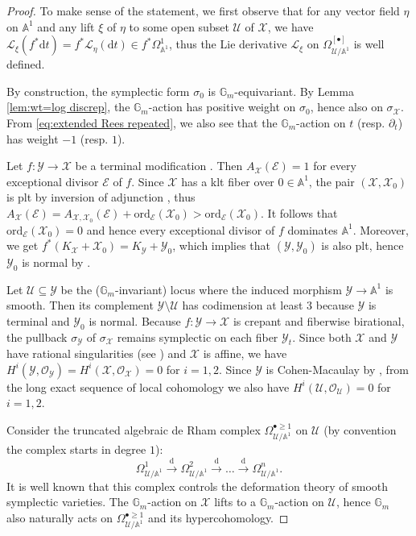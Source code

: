 \documentclass[12pt]{amsart}
\theoremstyle{definition}
\newcommand{\bA}{\mathbb{A}}
\newcommand{\bG}{\mathbb{G}}
\newcommand{\cO}{\mathcal{O}}
\newcommand{\cL}{\mathcal{L}}
\newcommand{\scX}{\mathscr{X}}
\newcommand{\scY}{\mathscr{Y}}
\newcommand{\scE}{\mathscr{E}}
\newcommand{\rd}{\mathrm{d}}
\newcommand{\ord}{\mathrm{ord}}
\numberwithin{equation}{section}
\begin{document}
\begin{proof}
To make sense of the statement, we first observe that for any vector field $\eta$ on $\bA^1$ and any lift $\xi$ of $\eta$ to some open subset $\mathscr{U}$ of $\scX$, we have $\cL_{\xi}(f^*\rd t) = f^*\cL_\eta (\rd t)\in f^*\Omega_{\bA^1}^1$, thus the Lie derivative $\cL_\xi$ on $\Omega_{\mathscr{U}/\bA^1}^{[\bullet]}$ is well defined.

By construction, the symplectic form $\sigma_0$ is $\bG_m$-equivariant. By Lemma \ref{lem:wt=log discrep}, the $\bG_m$-action has positive weight on $\sigma_0$, hence also on $\sigma_{\scX}$. From \eqref{eq:extended Rees repeated}, we also see that the $\bG_m$-action on $t$ (resp. $\partial_t$) has weight $-1$ (resp. $1$). 

Let $f\colon \scY\to \scX$ be a terminal modification \cite[Theorem 1.33]{Kol13}. Then $A_{\scX}(\scE)=1$ for every exceptional divisor $\scE$ of $f$. Since $\scX$ has a klt fiber over $0\in \bA^1$, the pair $(\scX,\scX_0)$ is plt by inversion of adjunction \cite[Theorem 5.50]{KM98}, thus $A_{\scX}(\scE) = A_{\scX,\scX_0}(\scE)+\ord_{\scE}(\scX_0)>\ord_{\scE}(\scX_0)$. It follows that $\ord_{\scE}(\scX_0) = 0$ and hence every exceptional divisor of $f$ dominates $\mathbb{A}^1$. Moreover, we get $f^*(K_{\scX}+\scX_0)=K_{\scY}+\scY_0$, which implies that $(\scY,\scY_0)$ is also plt, hence $\scY_0$ is normal by \cite[Proposition 5.51]{KM98}.

Let $\mathscr{U}\subseteq \scY$ be the ($\bG_m$-invariant) locus where the induced morphism $\scY\to \bA^1$ is smooth. Then its complement $\scY\setminus \mathscr{U}$ has codimension at least $3$ because $\scY$ is terminal and $\scY_0$ is normal. Because $f\colon \scY\to \scX$ is crepant and fiberwise birational, the pullback $\sigma_{\scY}$ of $\sigma_{\scX}$ remains symplectic on each fiber $\scY_t$. Since both $\scX$ and $\scY$ have rational singularities (see \cite[Theorem 5.22]{KM98}) and $\scX$ is affine, we have $H^i(\scY,\cO_{\scY})=H^i(\scX,\cO_{\scX})=0$ for $i=1,2$. Since $\scY$ is Cohen-Macaulay by \cite[Theorem 5.10]{KM98}, from the long exact sequence of local cohomology we also have $H^i(\mathscr{U},\cO_{\mathscr{U}})=0$ for $i=1,2$.

Consider the truncated algebraic de Rham complex $\Omega_{\mathscr{U}/\bA^1}^{\bullet\ge 1}$ on $\mathscr{U}$ (by convention the complex starts in degree $1$):
\[
\Omega_{\mathscr{U}/\bA^1}^1 \xrightarrow{\rd} \Omega_{\mathscr{U}/\bA^1}^2 \xrightarrow{\rd} \dots \xrightarrow{\rd} \Omega_{\mathscr{U}/\bA^1}^n . 
\]
It is well known that this complex controls the deformation theory of smooth symplectic varieties. The $\bG_m$-action on $\scX$ lifts to a $\bG_m$-action on $\mathscr{U}$, hence $\bG_m$ also naturally acts on $\Omega_{\mathscr{U}/\bA^1}^{\bullet\ge 1}$ and its hypercohomology. 


\end{proof}
\end{document}
